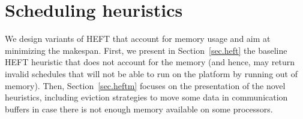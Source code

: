 \documentclass[conference]{IEEEtran}
\newcommand{\skug}[1]{{\color{blue}[SK: #1]}}
\begin{document}
%
%
%



\section{Scheduling heuristics} %
\label{sec:heuristics}


We design 
variants of HEFT that account for memory usage and aim at minimizing the makespan.
First, we present in Section~\ref{sec.heft} the baseline HEFT heuristic that does not account for the memory
(and hence, may return invalid schedules that will not be able to run on the platform
by running out of memory).  Then, Section~\ref{sec.heftm} focuses on the presentation of the novel
heuristics, including eviction strategies to move some data in communication buffers
in case there is not enough memory available on some processors.
\end{document}
